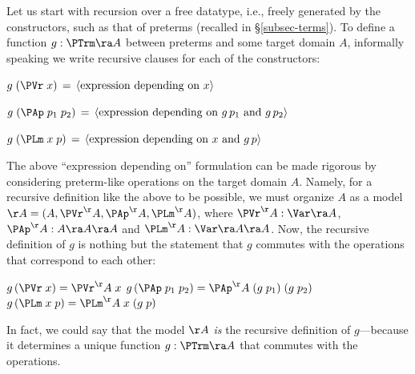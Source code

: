 Let us start with recursion %
over a %
free datatype, i.e., freely generated by the constructors, such as that of preterms (recalled in \S\ref{subsec-terms}). To define a function $g: \PTrm \ra A$ between preterms and some target domain $A$, informally speaking we write recursive clauses 
for each of the constructors:
\begin{mmyitem}
	\item %
	$g\;(\PVr\;x) \,=\, \langle \mbox{expression depending on $x$}\rangle$ 
	\item %
	$g\;(\PAp\;p_1\;p_2) \,=\, \langle \mbox{expression depending on $g\,p_1$ and $g\,p_2$}\rangle$
	\item %
	$g\;(\PLm\;x\;p) \,=\, \langle \mbox{expression depending on $x$ and $g\,p$}\rangle$
\end{mmyitem}
%

The above ``expression depending on'' formulation can be made rigorous by considering preterm-like operations on the target domain $A$. Namely, for a recursive definition like the above to be possible, we must organize $A$ as a model $\AA = (A,\PVr^\AA,\PAp^\AA,\PLm^\AA)$, where 
$\PVr^\AA : \Var \ra A$, $\PAp^\AA : A \ra A \ra A$ and 
$\PLm^\AA : \Var \ra A \ra A$. 
%
Now, the recursive definition of $g$ %
is nothing but the statement 
that $g$ commutes with 
the operations that correspond to each other: 
\begin{mmyitem}
	\item[] \hspace*{-2ex}$g\,(\PVr\;x) = \PVr^\AA\;x$
	\hspace*{4.2ex}
	$g\,(\PAp\;p_1\;p_2) = 
	\PAp^\AA\;(g\;p_1)\;(g\;p_2)$	
		\hspace*{4.2ex}
	$g\,(\PLm\;x\;p) = \PLm^\AA\;x\;(g\;p)$
\end{mmyitem}
%
In fact, we could say that the model $\AA$ 
\emph{is} the recursive definition of $g$---because it determines 
a unique 
function $g : \PTrm \ra A$ that commutes with the operations. 
%

